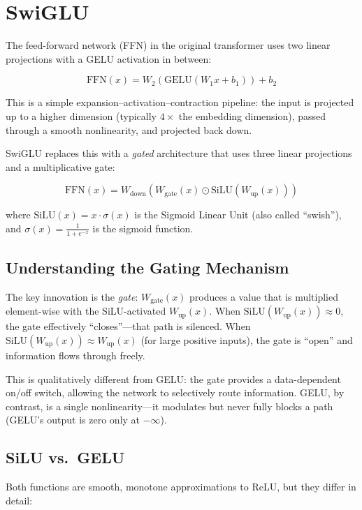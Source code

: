 \section{SwiGLU}

The feed-forward network (FFN) in the original transformer uses two linear
projections with a GELU activation in between:

\[
  \text{FFN}(x) = W_2\!\left(\text{GELU}(W_1 x + b_1)\right) + b_2
\]

This is a simple expansion--activation--contraction pipeline: the input is
projected up to a higher dimension (typically $4\times$ the embedding
dimension), passed through a smooth nonlinearity, and projected back down.

SwiGLU replaces this with a \emph{gated} architecture that uses three linear
projections and a multiplicative gate:

\[
  \text{FFN}(x) = W_{\text{down}}\!\left(W_{\text{gate}}(x) \odot \text{SiLU}(W_{\text{up}}(x))\right)
\]

where $\text{SiLU}(x) = x \cdot \sigma(x)$ is the Sigmoid Linear Unit (also
called ``swish''), and $\sigma(x) = \frac{1}{1 + e^{-x}}$ is the sigmoid
function.

\subsection{Understanding the Gating Mechanism}

The key innovation is the \emph{gate}: $W_{\text{gate}}(x)$ produces a value
that is multiplied element-wise with the SiLU-activated $W_{\text{up}}(x)$.
When $\text{SiLU}(W_{\text{up}}(x)) \approx 0$, the gate effectively
``closes''---that path is silenced. When $\text{SiLU}(W_{\text{up}}(x)) \approx
W_{\text{up}}(x)$ (for large positive inputs), the gate is ``open'' and
information flows through freely.

This is qualitatively different from GELU: the gate provides a data-dependent
on/off switch, allowing the network to selectively route information. GELU,
by contrast, is a single nonlinearity---it modulates but never fully blocks
a path (GELU's output is zero only at $-\infty$).

\subsection{SiLU vs.\ GELU}

Both functions are smooth, monotone approximations to ReLU, but they differ
in detail:

